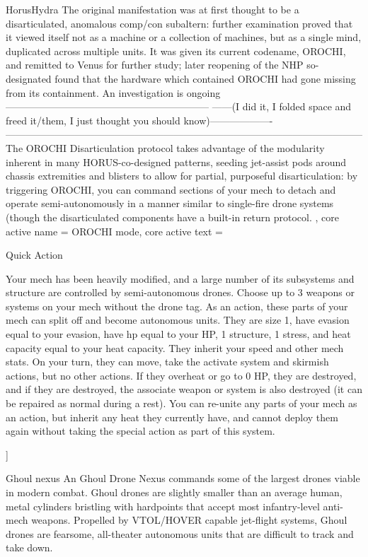 \begin{mech}{Horus}{Hydra}
{The original manifestation was at first thought to be a disarticulated, anomalous comp/con subaltern: further examination proved that it viewed itself not as a machine or a collection of machines, but as a single mind, duplicated across multiple units. It was given its current codename, OROCHI, and remitted to Venus for further study; later reopening of the NHP so-designated found that the hardware which contained OROCHI had gone missing from its containment. An investigation is ongoing--------------------------------------------------------------
------(I did it, I folded space and freed it/them, I just thought you should know)-------------------   
------------------------------------------------------------------------------------------------------------
The OROCHI Disarticulation protocol takes advantage of the modularity inherent in many HORUS-co-designed patterns, seeding jet-assist pods around chassis extremities and blisters to allow for partial, purposeful disarticulation: by triggering OROCHI, you can command sections of your mech to detach and operate semi-autonomously in a manner similar to single-fire drone systems (though the disarticulated components have a built-in return protocol. 
},
core active name = OROCHI mode,
core active text = {Quick Action

Your mech has been heavily modified, and a large number of its subsystems and structure are controlled by semi-autonomous drones. Choose up to 3 weapons or systems on your mech without the drone tag. As an action, these parts of your mech can split off and become autonomous units. They are size 1, have evasion equal to your evasion, have hp equal to your HP, 1 structure, 1 stress, and heat capacity equal to your heat capacity. They inherit your speed and other mech stats. On your turn, they can move, take the activate system and skirmish actions, but no other actions. If they overheat or go to 0 HP, they are destroyed, and if they are destroyed, the associate weapon or system is also destroyed (it can be repaired as normal during a rest). You can re-unite any parts of your mech as an action, but inherit any heat they currently have, and cannot deploy them again without taking the special action as part of this system. 
}]


Ghoul nexus
An Ghoul Drone Nexus commands some of the largest drones viable in modern combat. Ghoul drones are slightly smaller than an average human, metal cylinders bristling with hardpoints that accept most infantry-level anti-mech weapons. Propelled by VTOL/HOVER capable jet-flight systems, Ghoul drones are fearsome, all-theater autonomous units that are difficult to track and take down. 


\end{mech}

